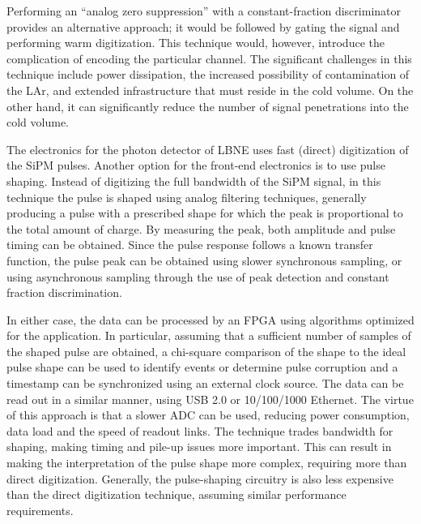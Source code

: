 
Performing an ``analog zero suppression'' with a constant-fraction discriminator 
provides an alternative approach; it would be followed by gating
the signal and performing warm digitization. This technique would, however, introduce the complication of encoding the particular channel.  
%
The significant
challenges in this technique include power dissipation, the increased
possibility of contamination of the LAr, and extended infrastructure
that must reside in the cold volume.  %
On the other hand, it can significantly reduce the number of signal penetrations into
the cold volume.


The electronics for the photon detector of LBNE uses fast (direct)
digitization of the SiPM pulses. Another option for the front-end
electronics is to use pulse shaping. Instead of digitizing the full
bandwidth of the SiPM signal, in this technique the pulse is shaped using analog
filtering techniques, generally producing a pulse with a prescribed
shape for which the peak is proportional to the total amount of charge.
By measuring the peak, both amplitude and pulse timing can be
obtained.  Since the pulse response follows a known transfer function,
the pulse peak can be obtained using slower synchronous sampling, or
using asynchronous sampling through the use of peak detection and
constant fraction discrimination.  

In either case, the data can be
processed by an FPGA using algorithms optimized for the application.
In particular, assuming that a sufficient number of samples of the shaped pulse are
obtained, a chi-square comparison of the shape to
the ideal pulse shape can be used to 
identify events or determine pulse corruption %
and a timestamp can be synchronized using an external clock source. The
data can be read out in a similar manner, using USB 2.0 or 10/100/1000
Ethernet.  The virtue of this approach is that a slower ADC can be
used, reducing power consumption, data load and the
speed of readout links.  The technique trades bandwidth for
shaping, making timing and pile-up issues more important.  This can
result in making the interpretation of the pulse shape more complex, 
requiring more 
than direct digitization.  Generally, the pulse-shaping circuitry is
also less expensive than the direct digitization technique, assuming
similar performance requirements.

